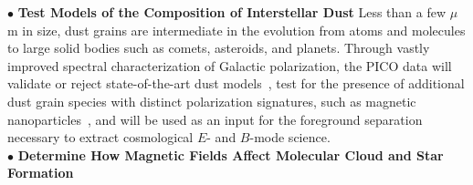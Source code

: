 \documentclass[PICOAPC.tex]{subfiles}
\begin{document}
%
$\bullet$ {\bf Test Models of the Composition of Interstellar Dust} \hspace{0.1in}  
Less than a few $\mu$m in size, dust grains are intermediate in the evolution from atoms and molecules to large solid bodies such as comets, asteroids, and planets. Through vastly improved spectral characterization of Galactic polarization, the PICO data will 
validate or reject state-of-the-art dust models~\citep[e.g.][]{Draine2009,Guillet2018,hensely_swp}, test for the presence of additional dust grain species with distinct polarization signatures, such as magnetic nanoparticles~\citep{Draine2013}, and will be used as an input for the foreground separation necessary to extract cosmological $E$- and $B$-mode science. \\
$\bullet$ {\bf Determine How Magnetic Fields Affect Molecular Cloud and Star Formation} \hspace{0.1in}
\end{document}
